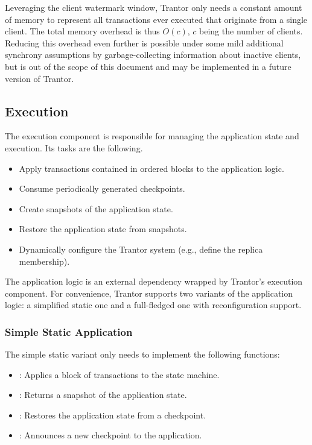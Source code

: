\documentclass{article}
\begin{document}
Leveraging the client watermark window, Trantor only needs a constant amount of memory to represent
all transactions ever executed that originate from a single client.
The total memory overhead is thus $O(c)$, $c$ being the number of clients.
Reducing this overhead even further is possible under some mild additional synchrony assumptions by garbage-collecting information about inactive clients,
but is out of the scope of this document and may be implemented in a future version of Trantor.

\subsection{Execution}
\label{sec:execution}

The execution component is responsible for managing the application state and execution. Its tasks are the following.

\begin{itemize}
    \item Apply transactions contained in ordered blocks to the application logic.
    \item Consume periodically generated checkpoints.
    \item Create snapshots of the application state.
    \item Restore the application state from snapshots.
    \item Dynamically configure the Trantor system (e.g., define the replica membership).
\end{itemize}

The application logic is an external dependency wrapped by Trantor’s execution component.
For convenience, Trantor supports two variants of the application logic: a simplified static one and a full-fledged one with reconfiguration support.

\subsubsection{Simple Static Application}

The simple static variant only needs to implement the following functions:

\begin{itemize}
    \item {}: Applies a block of transactions to the state machine.
    \item {}: Returns a snapshot of the application state.
    \item {}: Restores the application state from a checkpoint.
    \item {}: Announces a new checkpoint to the application.
\end{itemize}
\end{document}
